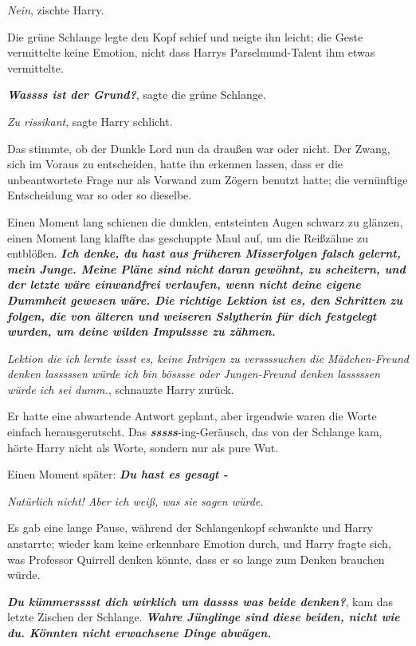 \glqq{}\emph{Nein}\grqq{}, zischte Harry.

Die grüne Schlange legte den Kopf schief und neigte ihn leicht; die Geste
vermittelte keine Emotion, nicht dass Harrys Parselmund-Talent ihm etwas
vermittelte.

\glqq{}\textbf{\emph{Wassss ist der Grund?}}\grqq{}, sagte die grüne Schlange.

\glqq{}\emph{Zu rissikant}\grqq{}, sagte Harry schlicht.

Das stimmte, ob der Dunkle Lord nun da draußen war oder nicht. Der Zwang, sich
im Voraus zu entscheiden, hatte ihn erkennen lassen, dass er die unbeantwortete
Frage nur als Vorwand zum Zögern benutzt hatte; die vernünftige Entscheidung war
so oder so dieselbe.

Einen Moment lang schienen die dunklen, entsteinten Augen schwarz zu glänzen,
einen Moment lang klaffte das geschuppte Maul auf, um die Reißzähne zu
entblößen. \glqq{}\textbf{\emph{Ich denke, du hast aus früheren Misserfolgen
falsch gelernt, mein Junge. Meine Pläne sind nicht daran gewöhnt, zu scheitern,
und der letzte wäre einwandfrei verlaufen, wenn nicht deine eigene Dummheit
gewesen wäre. Die richtige Lektion ist es, den Schritten zu folgen, die von
älteren und weiseren Sslytherin für dich festgelegt wurden, um deine wilden
Impulssse zu zähmen.}}\grqq{}

\glqq{}\emph{Lektion die ich lernte issst es, keine Intrigen zu verssssuchen die
Mädchen-Freund denken lasssssen würde ich bin bösssse oder Jungen-Freund denken
lasssssen würde ich sei dumm.}\grqq{}, schnauzte Harry zurück.

Er hatte eine abwartende Antwort geplant, aber irgendwie waren die Worte einfach
herausgerutscht. Das \textbf{\emph{sssss}}-ing-Geräusch, das von der Schlange
kam, hörte Harry nicht als Worte, sondern nur als pure Wut.

Einen Moment später: \glqq{}\textbf{\emph{Du hast es gesagt -}}\grqq{}

\glqq{}\emph{Natürlich nicht! Aber ich weiß, was sie sagen würde.}\grqq{}

Es gab eine lange Pause, während der Schlangenkopf schwankte und Harry
anstarrte; wieder kam keine erkennbare Emotion durch, und Harry fragte sich, was
Professor Quirrell denken könnte, dass er so lange zum Denken brauchen würde.

\glqq{}\textbf{\emph{Du kümmersssst dich wirklich um dassss was beide
denken?}}\grqq{}, kam das letzte Zischen der Schlange. \glqq{}\textbf{\emph{Wahre
Jünglinge sind diese beiden, nicht wie du. Könnten nicht erwachsene Dinge
abwägen.}}\grqq{}

